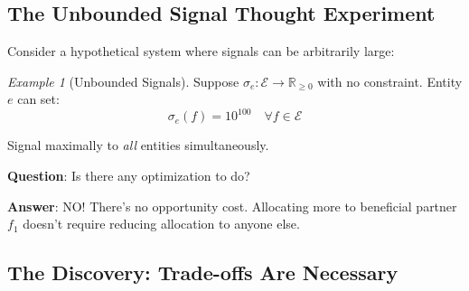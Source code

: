 \documentclass[11pt,a4paper]{article}
\theoremstyle{definition}
\theoremstyle{remark}
\newtheorem{example}[theorem]{Example}
\newcommand{\E}{\mathcal{E}}
\begin{document}
\subsection{The Unbounded Signal Thought Experiment}

Consider a hypothetical system where signals can be arbitrarily large:

\begin{example}[Unbounded Signals]
Suppose $\sigma_e: \E \to \mathbb{R}_{\ge 0}$ with no constraint. Entity $e$ can set:
\[ \sigma_e(f) = 10^{100} \quad \forall f \in \E \]

Signal maximally to \textit{all} entities simultaneously.

\textbf{Question}: Is there any optimization to do?

\textbf{Answer}: NO! There's no opportunity cost. Allocating more to beneficial partner $f_1$ doesn't require reducing allocation to anyone else.
\end{example}

\subsection{The Discovery: Trade-offs Are Necessary}
\end{document}
